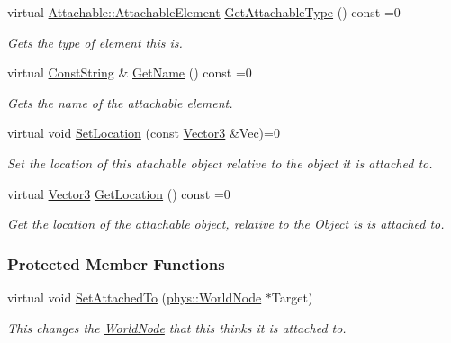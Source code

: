 \begin{DoxyCompactItemize}
virtual \hyperlink{classphys_1_1Attachable_acd1fca033e7cc0bb3024a92d466d213a}{Attachable::AttachableElement} \hyperlink{classphys_1_1Attachable_a1c84342fe19d8eef33de4789e19c9d00}{GetAttachableType} () const =0
\begin{DoxyCompactList}\small\item\em Gets the type of element this is. \item\end{DoxyCompactList}\item 
\hypertarget{classphys_1_1Attachable_a0a07d727fa2630dc3550fd991ca28256}{
virtual \hyperlink{namespacephys_a5ce5049f8b4bf88d6413c47b504ebb31}{ConstString} \& \hyperlink{classphys_1_1Attachable_a0a07d727fa2630dc3550fd991ca28256}{GetName} () const =0}
\label{df/dbd/classphys_1_1Attachable_a0a07d727fa2630dc3550fd991ca28256}

\begin{DoxyCompactList}\small\item\em Gets the name of the attachable element. \item\end{DoxyCompactList}\item 
virtual void \hyperlink{classphys_1_1Attachable_a3555ca694cfc9ff96665c16b3e95c698}{SetLocation} (const \hyperlink{classphys_1_1Vector3}{Vector3} \&Vec)=0
\begin{DoxyCompactList}\small\item\em Set the location of this atachable object relative to the object it is attached to. \item\end{DoxyCompactList}\item 
virtual \hyperlink{classphys_1_1Vector3}{Vector3} \hyperlink{classphys_1_1Attachable_acb410686b2719524eb484b50cc9054a4}{GetLocation} () const =0
\begin{DoxyCompactList}\small\item\em Get the location of the attachable object, relative to the Object is is attached to. \item\end{DoxyCompactList}\end{DoxyCompactItemize}
\subsubsection*{Protected Member Functions}
\begin{DoxyCompactItemize}
\item 
virtual void \hyperlink{classphys_1_1Attachable_a6f06a8c9950d5a9bfec0c73792cdd65f}{SetAttachedTo} (\hyperlink{classphys_1_1WorldNode}{phys::WorldNode} $\ast$Target)
\begin{DoxyCompactList}\small\item\em This changes the \hyperlink{classphys_1_1WorldNode}{WorldNode} that this thinks it is attached to. \item\end{DoxyCompactList}\end{DoxyCompactItemize}
